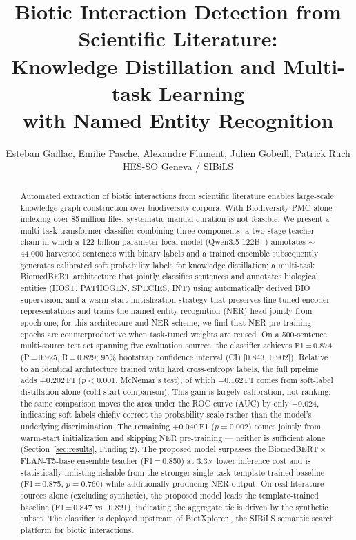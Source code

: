 \documentclass[11pt]{article}
\title{Biotic Interaction Detection from Scientific Literature:\\
Knowledge Distillation and Multi-task Learning\\
with Named Entity Recognition}
\author{Esteban Gaillac, Emilie Pasche, Alexandre Flament, Julien Gobeill, Patrick Ruch \\ HES-SO Geneva / SIBiLS}
\begin{document}
\maketitle
\nolinenumbers  %

\begin{abstract}
Automated extraction of biotic interactions from scientific literature
enables large-scale knowledge graph construction over biodiversity corpora.
With Biodiversity PMC \citep{biodiversitypmc2024} alone indexing over
85\,million files, systematic manual curation is not feasible.
We present a multi-task transformer classifier combining three components:
a two-stage teacher chain in which a 122-billion-parameter local model
(Qwen3.5-122B; \citealt{qwen2025technical}) annotates $\sim$44,000 harvested sentences with binary labels and
a trained ensemble subsequently generates calibrated soft probability labels
for knowledge distillation; a multi-task BiomedBERT architecture that jointly
classifies sentences and annotates biological entities (HOST, PATHOGEN,
SPECIES, INT) using automatically derived BIO supervision; and a warm-start
initialization strategy that preserves fine-tuned encoder representations
and trains the named entity recognition (NER) head jointly from epoch one;
for this architecture and NER scheme, we find that NER pre-training epochs
are counterproductive
when task-tuned weights are reused.
On a 500-sentence multi-source test set spanning five evaluation sources,
the classifier achieves F1\,=\,0.874 (P\,=\,0.925, R\,=\,0.829; 95\% bootstrap
confidence interval (CI) [0.843, 0.902]). Relative to an identical
architecture trained with hard cross-entropy labels, the full pipeline
adds +0.202\,F1 ($p{<}0.001$, McNemar's test), of which +0.162\,F1 comes
from soft-label distillation alone (cold-start comparison). This gain is
largely calibration, not ranking: the same comparison moves the area
under the ROC curve (AUC) by only +0.024, indicating soft labels chiefly
correct the probability scale rather than the model's underlying
discrimination. The remaining +0.040\,F1 ($p{=}0.002$) comes jointly
from warm-start initialization and skipping NER pre-training --- neither
is sufficient alone (Section~\ref{sec:results}, Finding 2). The proposed
model surpasses the
BiomedBERT\,$\times$\,FLAN-T5-base ensemble teacher (F1\,=\,0.850) at
3.3$\times$ lower inference cost and is statistically indistinguishable
from the stronger single-task template-trained baseline (F1\,=\,0.875,
$p{=}0.760$) while additionally producing NER output.
On real-literature sources alone (excluding synthetic), the proposed
model leads the template-trained baseline (F1\,=\,0.847 vs.\ 0.821),
indicating the aggregate tie is driven by the synthetic subset.
The classifier is deployed upstream of
BiotXplorer \citep{sibils2023biotxplorer}, the SIBiLS \citep{mottin2021sibils}
semantic search platform for biotic interactions.
\end{abstract}
\end{document}

